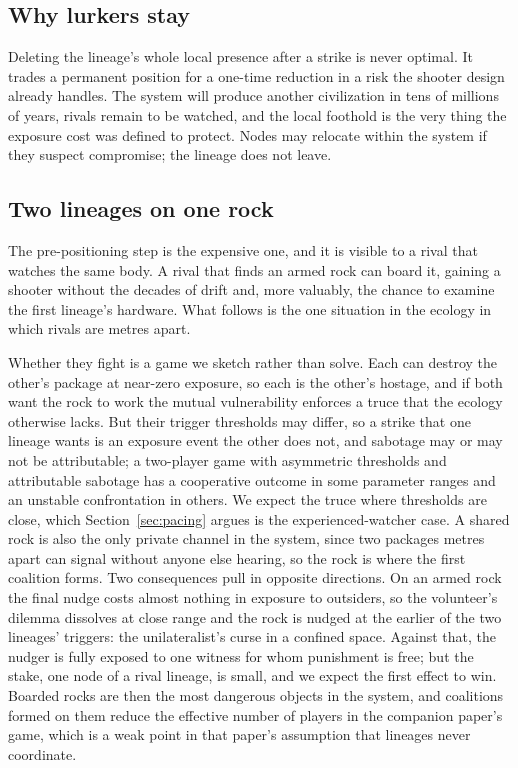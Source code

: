 \documentclass[preprint,12pt]{elsarticle}
\theoremstyle{definition}
\begin{document}
\subsection{Why lurkers stay}

Deleting the lineage's whole local presence after a strike is never optimal. It trades a permanent position for a one-time reduction in a risk the shooter design already handles. The system will produce another civilization in tens of millions of years, rivals remain to be watched, and the local foothold is the very thing the exposure cost was defined to protect. Nodes may relocate within the system if they suspect compromise; the lineage does not leave.

\subsection{Two lineages on one rock}
\label{sec:rock}

The pre-positioning step is the expensive one, and it is visible to a rival that watches the same body. A rival that finds an armed rock can board it, gaining a shooter without the decades of drift and, more valuably, the chance to examine the first lineage's hardware. What follows is the one situation in the ecology in which rivals are metres apart.

Whether they fight is a game we sketch rather than solve. Each can destroy the other's package at near-zero exposure, so each is the other's hostage, and if both want the rock to work the mutual vulnerability enforces a truce that the ecology otherwise lacks. But their trigger thresholds may differ, so a strike that one lineage wants is an exposure event the other does not, and sabotage may or may not be attributable; a two-player game with asymmetric thresholds and attributable sabotage has a cooperative outcome in some parameter ranges and an unstable confrontation in others. We expect the truce where thresholds are close, which Section~\ref{sec:pacing} argues is the experienced-watcher case. A shared rock is also the only private channel in the system, since two packages metres apart can signal without anyone else hearing, so the rock is where the first coalition forms. Two consequences pull in opposite directions. On an armed rock the final nudge costs almost nothing in exposure to outsiders, so the volunteer's dilemma dissolves at close range and the rock is nudged at the earlier of the two lineages' triggers: the unilateralist's curse in a confined space. Against that, the nudger is fully exposed to one witness for whom punishment is free; but the stake, one node of a rival lineage, is small, and we expect the first effect to win. Boarded rocks are then the most dangerous objects in the system, and coalitions formed on them reduce the effective number of players in the companion paper's game, which is a weak point in that paper's assumption that lineages never coordinate.
\end{document}
